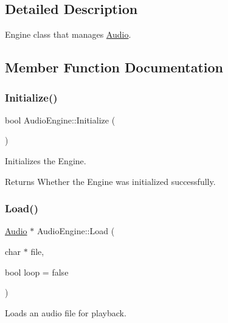 \subsection{Detailed Description}
Engine class that manages \hyperlink{class_audio}{Audio}. 

\subsection{Member Function Documentation}
\mbox{\label{class_audio_engine_a32ad2899215c9f207df28efb698d68f9}} 
\subsubsection{\texorpdfstring{Initialize()}{Initialize()}}
{\footnotesize\ttfamily bool Audio\+Engine\+::\+Initialize (\begin{DoxyParamCaption}{ }\end{DoxyParamCaption})\hspace{0.3cm}{\ttfamily [static]}}



Initializes the Engine. 

\begin{DoxyReturn}{Returns}
Whether the Engine was initialized successfully. 
\end{DoxyReturn}
\mbox{\label{class_audio_engine_a7ccb8d2fe6be78b16f457589962aedfe}} 
\subsubsection{\texorpdfstring{Load()}{Load()}}
{\footnotesize\ttfamily \hyperlink{class_audio}{Audio} $\ast$ Audio\+Engine\+::\+Load (\begin{DoxyParamCaption}\item[{char $\ast$}]{file,  }\item[{bool}]{loop = {\ttfamily false} }\end{DoxyParamCaption})\hspace{0.3cm}{\ttfamily [static]}}



Loads an audio file for playback. 


